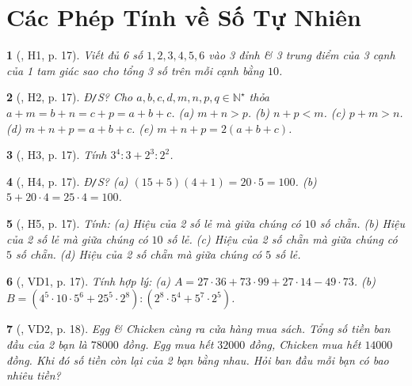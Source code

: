 \documentclass{article}
\newtheorem{baitoan}{}
\begin{document}
	

\section{Các Phép Tính về Số Tự Nhiên}

\begin{baitoan}[\cite{Binh_boi_duong_Toan_6_tap_1}, H1, p. 17]
	Viết đủ 6 số $1,2,3,4,5,6$ vào 3 đỉnh \& 3 trung điểm của 3 cạnh của 1 tam giác sao cho tổng 3 số trên mỗi cạnh bằng $10$.
\end{baitoan}

\begin{baitoan}[\cite{Binh_boi_duong_Toan_6_tap_1}, H2, p. 17]
	{\rm Đ{\tt/}S?} Cho $a,b,c,d,m,n,p,q\in\mathbb{N}^\star$ thỏa $a + m = b + n = c + p = a + b + c$. (a) $m + n > p$. (b) $n + p < m$. (c) $p + m > n$. (d) $m + n + p = a + b + c$. (e) $m + n + p = 2(a + b + c)$.
\end{baitoan}

\begin{baitoan}[\cite{Binh_boi_duong_Toan_6_tap_1}, H3, p. 17]
	Tính $3^4:3 + 2^3:2^2$.
\end{baitoan}

\begin{baitoan}[\cite{Binh_boi_duong_Toan_6_tap_1}, H4, p. 17]
	{\rm Đ{\tt/}S?} (a) $(15 + 5)(4 + 1) = 20\cdot5 = 100$. (b) $5 + 20\cdot4 = 25\cdot4 = 100$.
\end{baitoan}

\begin{baitoan}[\cite{Binh_boi_duong_Toan_6_tap_1}, H5, p. 17]
	Tính: (a) Hiệu của 2 số lẻ mà giữa chúng có $10$ số chẵn. (b) Hiệu của 2 số lẻ mà giữa chúng có $10$ số lẻ. (c) Hiệu của 2 số chẵn mà giữa chúng có $5$ số chẵn. (d) Hiệu của 2 số chẵn mà giữa chúng có $5$ số lẻ.
\end{baitoan}

\begin{baitoan}[\cite{Binh_boi_duong_Toan_6_tap_1}, VD1, p. 17]
	Tính hợp lý: (a) $A = 27\cdot36 + 73\cdot99 + 27\cdot14 - 49\cdot73$. (b) $B = (4^5\cdot10\cdot5^6 + 25^5\cdot2^8):(2^8\cdot5^4 + 5^7\cdot2^5)$.
\end{baitoan}

\begin{baitoan}[\cite{Binh_boi_duong_Toan_6_tap_1}, VD2, p. 18]
	Egg \& Chicken cùng ra cửa hàng mua sách. Tổng số tiền ban đầu của 2 bạn là $78000$ đồng. Egg mua hết $32000$ đồng, Chicken mua hết $14000$ đồng. Khi đó số tiền còn lại của 2 bạn bằng nhau. Hỏi ban đầu mỗi bạn có bao nhiêu tiền?
\end{baitoan}
\end{document}
